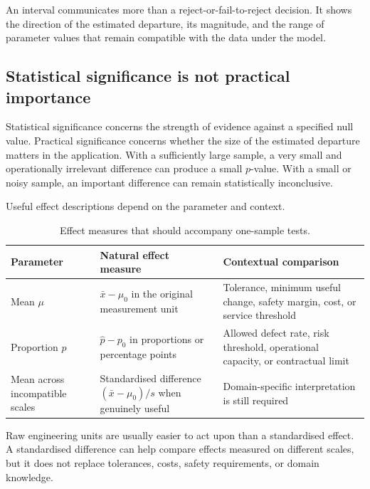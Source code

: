 An interval communicates more than a reject-or-fail-to-reject decision. It shows the direction of the estimated departure, its magnitude, and the range of parameter values that remain compatible with the data under the model.

\subsection{Statistical significance is not practical importance}

Statistical significance concerns the strength of evidence against a specified null value. Practical significance concerns whether the size of the estimated departure matters in the application. With a sufficiently large sample, a very small and operationally irrelevant difference can produce a small $p$-value. With a small or noisy sample, an important difference can remain statistically inconclusive.

Useful effect descriptions depend on the parameter and context.

\begin{table}[htbp]
\centering
\caption{Effect measures that should accompany one-sample tests.}
\label{tab:one-sample-effect-measures}
\begin{tabularx}{\textwidth}{@{}l>{\raggedright\arraybackslash}X>{\raggedright\arraybackslash}X@{}}
\toprule
Parameter & Natural effect measure & Contextual comparison \\
\midrule
Mean $\mu$ & $\bar x-\mu_0$ in the original measurement unit & Tolerance, minimum useful change, safety margin, cost, or service threshold \\
Proportion $p$ & $\hat p-p_0$ in proportions or percentage points & Allowed defect rate, risk threshold, operational capacity, or contractual limit \\
Mean across incompatible scales & Standardised difference $(\bar x-\mu_0)/s$ when genuinely useful & Domain-specific interpretation is still required \\
\bottomrule
\end{tabularx}
\end{table}

Raw engineering units are usually easier to act upon than a standardised effect. A standardised difference can help compare effects measured on different scales, but it does not replace tolerances, costs, safety requirements, or domain knowledge.

